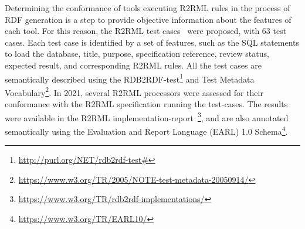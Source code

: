 Determining the conformance of tools executing R2RML rules in the process of RDF generation is a step to provide objective information about the features of each tool. For this reason, the R2RML test cases~\citep{R2RML_test_cases} were proposed, with 63 test cases. Each test case is identified by a set of features, such as the SQL statements to load the database, title, purpose, specification reference, review status, expected result, and corresponding R2RML rules. All the test cases are semantically described using the RDB2RDF-test\footnote{\url{http://purl.org/NET/rdb2rdf-test\#}} and Test Metadata Vocabulary\footnote{\url{https://www.w3.org/TR/2005/NOTE-test-metadata-20050914/}}. In 2021, several R2RML processors were assessed for their conformance with the R2RML specification running the test-cases. The results were available in the R2RML implementation-report~\footnote{\url{https://www.w3.org/TR/rdb2rdf-implementations/}}, and are also annotated semantically using the Evaluation and Report Language (EARL) 1.0 Schema\footnote{\url{https://www.w3.org/TR/EARL10/}}.


